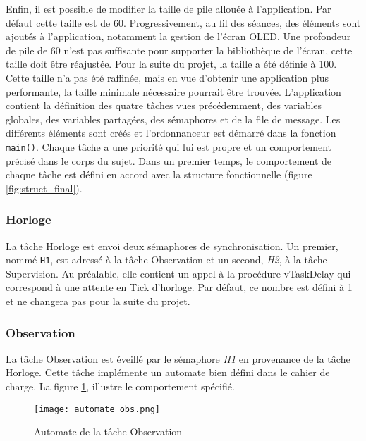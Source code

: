 
Enfin, il est possible de modifier la taille de pile allouée à l'application.
Par défaut cette taille est de 60.
Progressivement, au fil des séances, des éléments sont ajoutés à l'application, notamment la gestion de l'écran OLED.
Une profondeur de pile de 60 n'est pas suffisante pour supporter la bibliothèque de l'écran, cette taille doit être réajustée.
Pour la suite du projet, la taille a été définie à 100.
Cette taille n'a pas été raffinée, mais en vue d'obtenir une application plus performante, la taille minimale nécessaire pourrait être trouvée.
L'application contient la définition des quatre tâches vues précédemment, des variables globales, des variables partagées, des sémaphores et de la file de message.
Les différents éléments sont créés et l'ordonnanceur est démarré dans la fonction \texttt{main()}.
Chaque tâche a une priorité qui lui est propre et un comportement précisé dans le corps du sujet.
Dans un premier temps, le comportement de chaque tâche est défini en accord avec la structure fonctionnelle (figure \ref{fig:struct_final}).

\subsubsection{Horloge}
La tâche Horloge est envoi deux sémaphores de synchronisation.
Un premier, nommé \texttt{H1}, est adressé à la tâche Observation et un second, \textit{H2}, à la tâche Supervision.
Au préalable, elle contient un appel à la procédure vTaskDelay qui correspond à une attente en Tick d'horloge.
Par défaut, ce nombre est défini à 1 et ne changera pas pour la suite du projet.

\subsubsection{Observation}
La tâche Observation est éveillé par le sémaphore \textit{H1} en provenance de la tâche Horloge.
Cette tâche implémente un automate bien défini dans le cahier de charge.
La figure \ref{fig:automate}, illustre le comportement spécifié.

\begin{figure}[h]
    \centering
    \texttt{[image: automate\_obs.png]}
    \caption{Automate de la tâche Observation}
    \label{fig:automate}
\end{figure}

